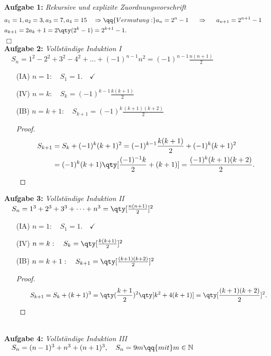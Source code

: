 
\textbf{Aufgabe 1: } \emph{Rekursive und explizite Zuordnungsvorschrift}
\begin{align}
    & a_1 = 1, a_2 = 3, a_3 = 7, a_4 = 15 \quad \Rightarrow \qq{Vermutung: } a_n=2^n-1 \hspace{0.5cm} \Rightarrow \hspace{0.5cm} a_{n+1}=2^{n+1}-1 \\
    &a_{k+1}=2a_k+1=2\qty(2^k-1)=2^{k+1}-1.
\end{align}\hfill $\Box$\\[0.7cm] 
%
\textbf{Aufgabe 2: } \emph{Vollständige Induktion I} $\quad S_n = 1^2 -2^2 + 3^2 -4^2 + \hdots + (-1)^{n-1}n^2 = (-1)^{n-1}\frac{n(n+1)}{2}$
\begin{enumerate}
    \item[(IA)] $n=1: \quad S_1 = 1. \quad\checkmark$ 
    \item[(IV)] $n=k: \quad S_k=(-1)^{k-1}\frac{k(k+1)}{2}$
    \item[(IB)] $n=k+1: \quad S_{k+1}=(-1)^{k}\frac{(k+1)(k+2)}{2}$
    \begin{proof}$~$\\[-1.5cm]
        \begin{align}
            \qquad S_{k+1} &= S_k + (-1)^k (k+1)^2 =(-1)^{k-1}\frac{k(k+1)}{2}+(-1)^k(k+1)^2\\
            &=(-1)^k(k+1)\qty[\frac{(-1)^{-1}k}{2}+(k+1)]=\frac{(-1)^{k}(k+1)(k+2)}{2}.
        \end{align}
    \end{proof}
\end{enumerate}
%
\textbf{Aufgabe 3: } \emph{Vollständige Induktion II} $\quad S_n=1^3+2^3+3^3+\dots+n^3 = \qty[\frac{n(n+1)}{2}]^2$

\begin{enumerate}
    \item[(IA)] $n=1: \quad S_1 = 1. \quad\checkmark$ 
    \item[(IV)] $n=k: \quad S_k=\qty[\frac{k(k+1)}{2}]^2$
    \item[(IB)] $n=k+1: \quad S_{k+1}=\qty[\frac{(k+1)(k+2)}{2}]^2$\\
    \begin{proof}$~$\\[-1.7cm]
        \begin{align}
            \qquad S_{k+1} &= S_k+(k+1)^3=\qty(\frac{k+1}{2})^2\qty[k^2+4(k+1)]=\qty[\frac{(k+1)(k+2)}{2}]^2.
        \end{align}
    \end{proof}
\end{enumerate}
%
\newpage
\ \\
\textbf{Aufgabe 4: } \emph{Vollständige Induktion III} $\quad S_n = (n-1)^3 + n^3 + (n+1)^3, \quad S_n = 9m \qq{mit} m \in \mathbb{N}$

